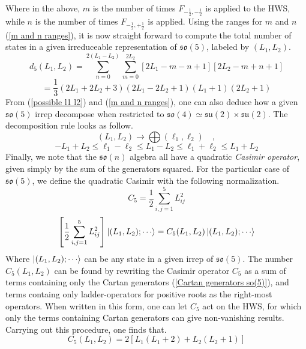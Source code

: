 Where in the above, $m$ is the number of times $F_{-\frac{1}{2},-\frac{1}{2}}$ is applied to the HWS, while $n$ is the number of times $F_{-\frac{1}{2},+\frac{1}{2}}$ is applied. Using the ranges for $m$ and $n$ (\ref{m and n ranges}), it is now straight forward to compute the total number of states in a given irreduceable representation of $\mathfrak{so}(5)$, labeled by $(L_1, L_2)$.
%
%
\begin{equation*}
d_5(L_1,L_2)
=
\sum_{n=0}^{2 (L_1 - L_2)}
\sum_{m=0}^{2 L_2}
[2 L_1 - m - n + 1] [2 L_2 - m + n + 1]
\end{equation*}
%
%
\begin{equation}\label{so(5) irrep dimensions}
=
\frac{1}{3}
(2 L_1 + 2 L_2 + 3)
(2 L_1 - 2 L_2 + 1)
(L_1 + 1)
(2 L_2 + 1)
\end{equation}
%
%
From (\ref{possible l1 l2}) and (\ref{m and n ranges}), one can also deduce how a given $\mathfrak{so}(5)$ irrep decompose when restricted to $\mathfrak{so}(4) \simeq \mathfrak{su}(2) \times \mathfrak{su}(2)$. The decomposition rule looks as follow.
%
%
\begin{equation*}
(L_1, L_2) \rightarrow \bigoplus (\ell_1, \ell_2)
%
\quad ,
\end{equation*}
%
%
\begin{equation}
-L_1 + L_2 \leq \ell_1 - \ell_2 \leq L_1 - L_2 \leq \ell_1 + \ell_2 \leq L_1 + L_2
\end{equation}
%
%
Finally, we note that the $\mathfrak{so}(n)$ algebra all have a quadratic \textit{Casimir operator}, given simply by the sum of the generators squared. For the particular case of $\mathfrak{so}(5)$, we define the quadratic Casimir with the following normalization.
%
%
\begin{equation}
C_5 = \frac{1}{2} \sum_{i,j=1}^5 L_{ij}^2
\end{equation}
%
%
\begin{equation}
\left[ \frac{1}{2} \sum_{i,j=1}^5 L_{ij}^2 \right] \ket{(L_1,L_2); \cdots }
=
C_5(L_1, L_2) \ket{(L_1,L_2); \cdots }
\end{equation}
%
%
Where $\ket{(L_1,L_2); \cdots }$ can be any state in a given irrep of $\mathfrak{so}(5)$. The number $C_5(L_1,L_2)$ can be found by rewriting the Casimir operator $C_5$ as a sum of terms containing only the Cartan generators (\ref{Cartan generators so(5)}), and terms containg only ladder-operators for positive roots as the right-most operators. When written in this form, one can let $C_5$ act on the HWS, for which only the terms containing Cartan generators can give non-vanishing results. Carrying out this procedure, one finds that.
%
%
\begin{equation}
C_5(L_1, L_2) = 2 \left[ L_1 (L_1 + 2) + L_2 (L_2 + 1) \right]
\end{equation}
%
%

